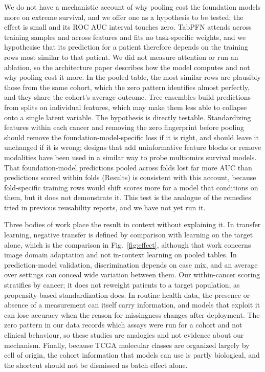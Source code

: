 We do not have a mechanistic account of why pooling cost the foundation models more on extreme survival, and we offer one as a hypothesis to be tested; the effect is small and its ROC AUC interval touches zero. TabPFN attends across training samples and across features and fits no task-specific weights,\citep{hollmann2025accurate} and we hypothesise that its prediction for a patient therefore depends on the training rows most similar to that patient. We did not measure attention or run an ablation, so the architecture paper describes how the model computes and not why pooling cost it more. In the pooled table, the most similar rows are plausibly those from the same cohort, which the zero pattern identifies almost perfectly, and they share the cohort's average outcome. Tree ensembles build predictions from splits on individual features,\citep{breiman2001random,chen2016xgboost} which may make them less able to collapse onto a single latent variable. The hypothesis is directly testable. Standardizing features within each cancer and removing the zero fingerprint before pooling should remove the foundation-model-specific loss if it is right, and should leave it unchanged if it is wrong; designs that add uninformative feature blocks or remove modalities have been used in a similar way to probe multiomics survival models.\citep{wissel2023systematic} That foundation-model predictions pooled across folds lost far more AUC than predictions scored within folds (Results) is consistent with this account, because fold-specific training rows would shift scores more for a model that conditions on them, but it does not demonstrate it. This test is the analogue of the remedies tried in previous reusability reports, and we have not yet run it.

Three bodies of work place the result in context without explaining it. In transfer learning, negative transfer is defined by comparison with learning on the target alone, which is the comparison in Fig.~\ref{fig:effect}, although that work concerns image domain adaptation and not in-context learning on pooled tables.\citep{wang2019characterizing} In prediction-model validation, discrimination depends on case mix, and an average over settings can conceal wide variation between them.\citep{dejong2023propensity,riley2016external} Our within-cancer scoring stratifies by cancer; it does not reweight patients to a target population, as propensity-based standardization does.\citep{dejong2023propensity} In routine health data, the presence or absence of a measurement can itself carry information, and models that exploit it can lose accuracy when the reason for missingness changes after deployment.\citep{sisk2021informative,rockenschaub2024robust} The zero pattern in our data records which assays were run for a cohort and not clinical behaviour, so these studies are analogies and not evidence about our mechanism. Finally, because TCGA molecular classes are organized largely by cell of origin,\citep{hoadley2018cell} the cohort information that models can use is partly biological, and the shortcut should not be dismissed as batch effect alone.

